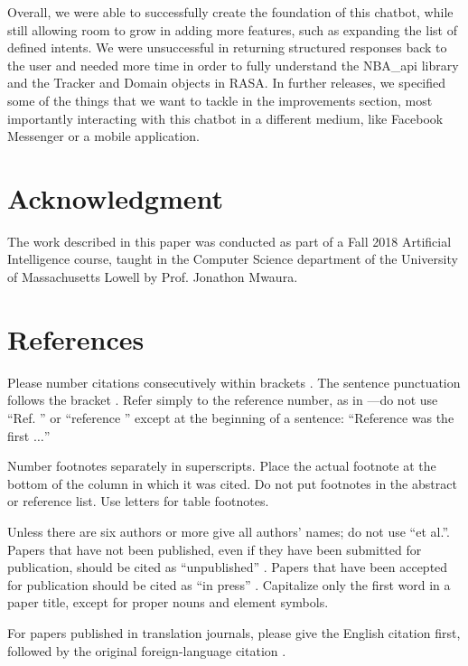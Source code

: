 \documentclass[conference]{IEEEtran}
\begin{document}
Overall, we were able to successfully create the foundation of this chatbot, while still allowing room to grow in adding more features, such as expanding the list of defined intents. We were unsuccessful in returning structured responses back to the user and needed more time in order to fully understand the NBA\_api library and the Tracker and Domain objects in RASA. In further releases, we specified some of the things that we want to tackle in the improvements section, most importantly interacting with this chatbot in a different medium, like Facebook Messenger or a mobile application.

\section*{Acknowledgment}
The work described in this paper was conducted as part of a Fall 2018 Artificial Intelligence course, taught in the Computer Science department of the University of Massachusetts Lowell by Prof. Jonathon Mwaura.


\section*{References}

Please number citations consecutively within brackets \cite{b1}. The
sentence punctuation follows the bracket \cite{b2}. Refer simply to the reference
number, as in \cite{b3}---do not use ``Ref. \cite{b3}'' or ``reference \cite{b3}'' except at
the beginning of a sentence: ``Reference \cite{b3} was the first $\ldots$''

Number footnotes separately in superscripts. Place the actual footnote at
the bottom of the column in which it was cited. Do not put footnotes in the
abstract or reference list. Use letters for table footnotes.

Unless there are six authors or more give all authors' names; do not use
``et al.''. Papers that have not been published, even if they have been
submitted for publication, should be cited as ``unpublished'' \cite{b4}. Papers
that have been accepted for publication should be cited as ``in press'' \cite{b5}.
Capitalize only the first word in a paper title, except for proper nouns and
element symbols.

For papers published in translation journals, please give the English
citation first, followed by the original foreign-language citation \cite{b6}.
\end{document}
